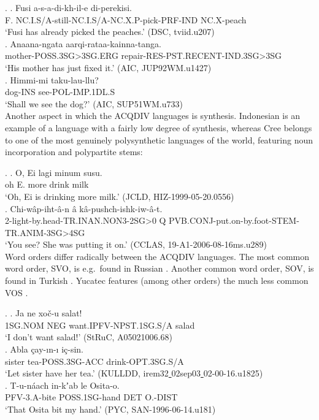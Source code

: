 \documentclass[a4paper, 11pt]{book}
\newcommand{\source}[1]{\hfill (#1)\\[-0.2cm]}	%
\newcommand{\und}{\underline{{ }}\hspace{0.2mm}}	%
\begin{document}
\ex.
	\ag. Fusi a-s-a-di-kh-il-e di-perekisi. \\
		F. NC.I.S/A-still-NC.I.S/A-NC.X.P-pick-PRF-IND NC.X-peach \\
		‘Fusi has already picked the peaches.’ \source{DSC, tviid.u207}
	\bg. Anaana-ngata aarqi-rataa-kainna-tanga. \\
		mother-POSS.3SG>3SG.ERG repair-RES-PST.RECENT-IND.3SG>3SG \\
		‘His mother has just fixed it.’ \source{AIC, JUP92WM.u1427}
	\cg. Himmi-mi taku-lau-llu? \\
		dog-INS see-POL-IMP.1DL.S \\
		‘Shall we see the dog?’ \source{AIC, SUP51WM.u733}

Another aspect in which the ACQDIV languages is synthesis. Indonesian \Next[a] is an example of a language with a fairly low degree of synthesis, whereas Cree \Next[b] belongs to one of the most genuinely polysynthetic languages of the world, featuring noun incorporation and polypartite stems: 

\ex.
	\ag. O, Ei lagi minum susu. \\
		oh E. more drink milk  \\
		‘Oh, Ei is drinking more milk.’ \source{JCLD, HIZ-1999-05-20.0556}
	\bg. Chi-wâp-iht-â-n â kâ-pushch-ishk-iw-â-t. \\
		2-light-by.head-TR.INAN.NON3-2SG>0 Q PVB.CONJ-put.on-by.foot-STEM-TR.ANIM-3SG>4SG \\
		‘You see? She was putting it on.’ \source{CCLAS, 19-A1-2006-08-16ms.u289}


Word orders differ radically between the ACQDIV languages. The most common word order, SVO, is e.g.\ found in Russian \Next[a]. Another common word order, SOV, is found in Turkish \Next[b]. Yucatec features (among other orders) the much less common VOS \Next[c].

\ex.
	\ag. Ja ne xoč-u salat! \\
		1SG.NOM NEG want.IPFV-NPST.1SG.S/A salad \\
		‘I don’t want salad!’ \source{StRuC, A05021006.68}
	\bg. Abla çay-ın-ı iç-sin. \\
		sister tea-POSS.3SG-ACC drink-OPT.3SG.S/A \\
		‘Let sister have her tea.’ \source{KULLDD, irem32\und 02sep03\und 02-00-16.u1825}
	\cg. T-u-náach in-kʼab le Osita-o. \\
		PFV-3.A-bite POSS.1SG-hand DET O.-DIST \\
		‘That Osita bit my hand.’ \source{PYC, SAN-1996-06-14.u181}
\end{document}
